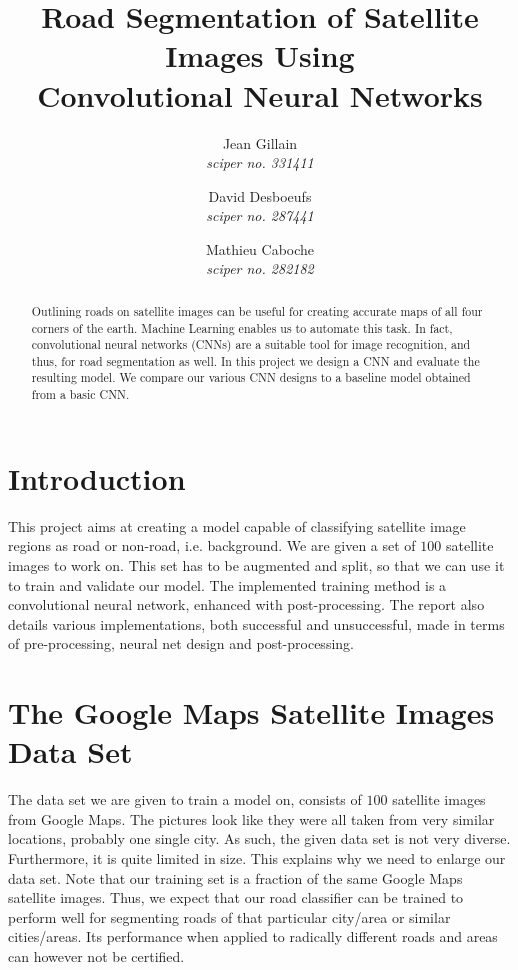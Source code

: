 \documentclass[10pt,conference,compsocconf]{IEEEtran}
\begin{document}
\title{Road Segmentation of Satellite Images Using \\ Convolutional Neural Networks}

\author{
	Jean Gillain\\
	\textit{sciper no. 331411}
	\and
	 David Desboeufs\\
	 \textit{sciper no. 287441}
	 \and 
	 Mathieu Caboche\\
	 \textit{sciper no. 282182}
}

\maketitle

\begin{abstract}
	Outlining roads on satellite images can be useful for creating accurate maps of all four corners of the earth. Machine Learning enables us to automate this task. In fact, convolutional neural networks (CNNs) are a suitable tool for image recognition, and thus, for road segmentation as well. In this project we design a CNN and evaluate the resulting model. We compare our various CNN designs to a baseline model obtained from a basic CNN.
	
\end{abstract}

\section{Introduction}

This project aims at creating a model capable of classifying satellite image regions as road or non-road, i.e. background. We are given a set of $100$ satellite images to work on. This set has to be augmented and split, so that we can use it to train and validate our model. The implemented training method is a convolutional neural network, enhanced with post-processing. The report also details various implementations, both successful and unsuccessful, made in terms of pre-processing, neural net design and post-processing.


\section{The Google Maps Satellite Images Data Set}
\label{sec:dataset}
The data set we are given to train a model on, consists of $100$ satellite images from Google Maps. The pictures look like they were all taken from very similar locations, probably one single city. As such, the given data set is not very diverse. Furthermore, it is quite limited in size. This explains why we need to enlarge our data set. Note that our training set is a fraction of the same Google Maps satellite images. Thus, we expect that our road classifier can be trained to perform well for segmenting roads of that particular city/area or similar cities/areas. Its performance when applied to radically different roads and areas can however not be certified.
\end{document}

